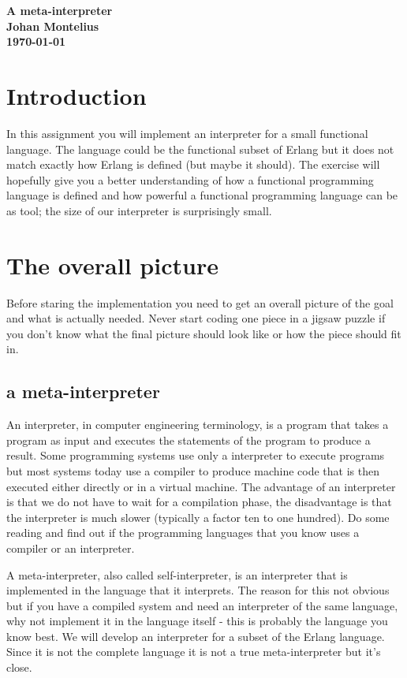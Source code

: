 \documentclass[a4paper,11pt]{article}
\newcommand{\nnsection}[1]{
\section*{#1}
\addcontentsline{toc}{section}{#1}
}
\begin{document}
\begin{center}\vspace{20pt}
\textbf{\large A meta-interpreter}\\
\vspace{10pt}
\textbf{Johan Montelius}\\ 
\vspace{10pt}
\textbf{\today}
\end{center}

\nnsection{Introduction}

In this assignment you will implement an interpreter for a small
functional language. The language could be the functional subset of
Erlang but it does not match exactly how Erlang is defined (but maybe
it should). The exercise will hopefully give you a better
understanding of how a functional programming language is defined and
how powerful a functional programming language can be as tool; the
size of our interpreter is surprisingly small.

\section{The overall picture}

Before staring the implementation you need to get an overall picture
of the goal and what is actually needed. Never start coding one piece
in a jigsaw puzzle if you don't know what the final picture should look
like or how the piece should fit in.

\subsection{a meta-interpreter}

An interpreter, in computer engineering terminology, is a program that
takes a program as input and executes the statements of the program to
produce a result. Some programming systems use only a interpreter to
execute programs but most systems today use a compiler to produce
machine code that is then executed either directly or in a
virtual machine. The advantage of an interpreter is that we do not
have to wait for a compilation phase, the disadvantage is that the
interpreter is much slower (typically a factor ten to one hundred).
Do some reading and find out if the programming languages that you
know uses a compiler or an interpreter.

A meta-interpreter, also called self-interpreter, is an interpreter
that is implemented in the language that it interprets. The reason for
this not obvious but if you have a compiled system and need an
interpreter of the same language, why not implement it in the language
itself - this is probably the language you know best. We will develop
an interpreter for a subset of the Erlang language. Since it is not the
complete language it is not a true meta-interpreter but it's close.
\end{document}

